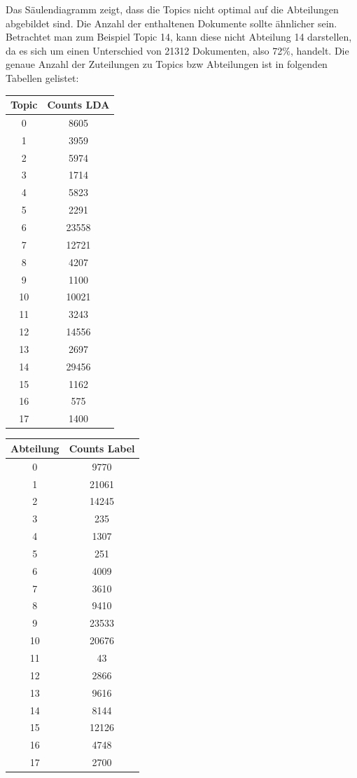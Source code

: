 \documentclass[german,version-2020-11]{uzl-thesis}
\begin{document}
\begin{enumerate}
\begin{center}
\end{center}

Das Säulendiagramm zeigt, dass die Topics nicht optimal auf die Abteilungen abgebildet sind. Die Anzahl der enthaltenen Dokumente sollte ähnlicher sein. Betrachtet man zum Beispiel Topic 14, kann diese nicht Abteilung 14 darstellen, da es sich um einen Unterschied von 21312 Dokumenten, also 72$\%$, handelt. Die genaue Anzahl der Zuteilungen zu Topics bzw Abteilungen ist in folgenden Tabellen gelistet: 

\begin{center}
\begin{tabular}{cc}
\hline 
\hline
Topic&Counts LDA\\
\hline
0&8605\\
1&3959\\
2&5974\\
3&1714\\
4&5823\\
5&2291\\
6&23558\\
7&12721\\
8&4207\\
9&1100\\
10&10021\\
11&3243\\
12&14556\\
13&2697\\
14&29456\\
15&1162\\
16&575\\
17&1400\\
\hline
\hline
\end{tabular}
\quad
\begin{tabular}{cc}
\hline
\hline
Abteilung & Counts Label\\
\hline
0&9770\\
1&21061\\
2&14245\\
3&235\\
4&1307\\
5&251\\
6&4009\\
7&3610\\
8&9410\\
9&23533\\
10&20676\\
11&43\\
12&2866\\
13&9616\\
14&8144\\
15&12126\\
16&4748\\
17&2700\\
\hline
\hline
\end{tabular}
\end{center}


\end{enumerate}
\end{document}
